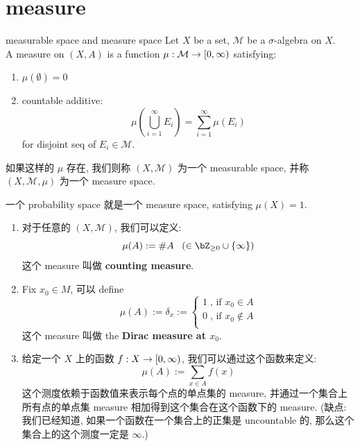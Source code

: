 \documentclass[lang=cn,11pt]{elegantbook}
\begin{document}
\section{measure}
\begin{definition}{measurable space and measure space}
    Let $X$ be a set, $\mathcal{M}$ be a $\sigma$-algebra on $X$.\\
    A measure on $(X,A)$ is a function $\mu: \mathcal{M} \rightarrow [0, \infty)$ satisfying:
    \begin{enumerate}
        \item $\mu(\emptyset) = 0$
        \item countable additive: 
        $$
        \mu(\bigcup_{i=1}^\infty E_i) = \sum_{i=1}^{\infty} \mu(E_i)  
        $$ for disjoint seq of $E_i \in \mathcal{M}$.
    \end{enumerate}

    如果这样的 $\mu$ 存在, 我们则称 $(X,\mathcal{M})$ 为一个 measurable space, 并称 $(X,\mathcal{M}, \mu)$ 为一个 measure space.
\end{definition}
\begin{remark}
    一个 probability space 就是一个 measure space, satisfying $\mu(X) = 1$.
\end{remark}

\begin{example}
\begin{enumerate}
    \item 对于任意的 $(X, \mathcal{M})$, 我们可以定义:
    $$
    \mu(A) := \#A \;\;\;(\in \bZ_{\geq 0} \cup \{\infty \})
    $$
    这个 measure 叫做 \textbf{counting measure}.
    \item 
    Fix $x_0 \in M$, 可以 define
    $$
    \mu(A) := \delta_x := \begin{cases}
        1 \; \text{, if } x_0 \in A \\
        0 \; \text{, if } x_0 \not\in A \\
    \end{cases}
    $$
    这个 measure 叫做 the \textbf{Dirac measure at $x_0$}.
    \item 
    给定一个 $X$ 上的函数 $f: X \rightarrow [0, \infty)$, 我们可以通过这个函数来定义:
    $$
    \mu(A) := \sum_{x \in A} f(x)
    $$
    这个测度依赖于函数值来表示每个点的单点集的 measure, 并通过一个集合上所有点的单点集 measure 相加得到这个集合在这个函数下的 measure. (缺点: 我们已经知道, 如果一个函数在一个集合上的正集是 uncountable 的, 那么这个集合上的这个测度一定是 $\infty$.)
    \end{enumerate}
\end{example}
\end{document}
